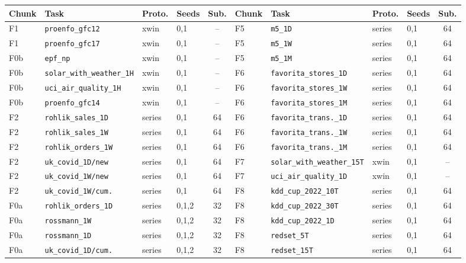 \begin{table}[t]
\centering
\footnotesize
\begin{tabular}{@{}llllc@{\hspace{1.2em}}llllc@{}}
\toprule
Chunk & Task & Proto. & Seeds & Sub. & Chunk & Task & Proto. & Seeds & Sub. \\
\midrule
F1 & \texttt{proenfo\_gfc12} & xwin & 0,1 & -- & F5 & \texttt{m5\_1D} & series & 0,1 & 64 \\
F1 & \texttt{proenfo\_gfc17} & xwin & 0,1 & -- & F5 & \texttt{m5\_1W} & series & 0,1 & 64 \\
F0b & \texttt{epf\_np} & xwin & 0,1 & -- & F5 & \texttt{m5\_1M} & series & 0,1 & 64 \\
F0b & \texttt{solar\_with\_weather\_1H} & xwin & 0,1 & -- & F6 & \texttt{favorita\_stores\_1D} & series & 0,1 & 64 \\
F0b & \texttt{uci\_air\_quality\_1H} & xwin & 0,1 & -- & F6 & \texttt{favorita\_stores\_1W} & series & 0,1 & 64 \\
F0b & \texttt{proenfo\_gfc14} & xwin & 0,1 & -- & F6 & \texttt{favorita\_stores\_1M} & series & 0,1 & 64 \\
F2 & \texttt{rohlik\_sales\_1D} & series & 0,1 & 64 & F6 & \texttt{favorita\_trans.\_1D} & series & 0,1 & 64 \\
F2 & \texttt{rohlik\_sales\_1W} & series & 0,1 & 64 & F6 & \texttt{favorita\_trans.\_1W} & series & 0,1 & 64 \\
F2 & \texttt{rohlik\_orders\_1W} & series & 0,1 & 64 & F6 & \texttt{favorita\_trans.\_1M} & series & 0,1 & 64 \\
F2 & \texttt{uk\_covid\_1D/new} & series & 0,1 & 64 & F7 & \texttt{solar\_with\_weather\_15T} & xwin & 0,1 & -- \\
F2 & \texttt{uk\_covid\_1W/new} & series & 0,1 & 64 & F7 & \texttt{uci\_air\_quality\_1D} & xwin & 0,1 & -- \\
F2 & \texttt{uk\_covid\_1W/cum.} & series & 0,1 & 64 & F8 & \texttt{kdd\_cup\_2022\_10T} & series & 0,1 & 64 \\
F0a & \texttt{rohlik\_orders\_1D} & series & 0,1,2 & 32 & F8 & \texttt{kdd\_cup\_2022\_30T} & series & 0,1 & 64 \\
F0a & \texttt{rossmann\_1W} & series & 0,1,2 & 32 & F8 & \texttt{kdd\_cup\_2022\_1D} & series & 0,1 & 64 \\
F0a & \texttt{rossmann\_1D} & series & 0,1,2 & 32 & F8 & \texttt{redset\_5T} & series & 0,1 & 64 \\
F0a & \texttt{uk\_covid\_1D/cum.} & series & 0,1,2 & 32 & F8 & \texttt{redset\_15T} & series & 0,1 & 64 \\

\end{tabular}
\end{table}
